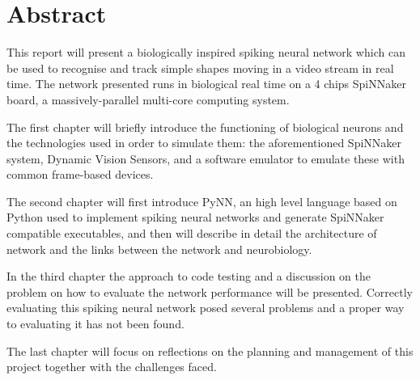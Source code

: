 \thispagestyle{plain}
\chapter*{Abstract}
This report will present a biologically inspired spiking neural network which can be used to recognise and track simple shapes moving in a video stream in real time. The network presented runs in biological real time on a 4 chips SpiNNaker board, a massively-parallel multi-core computing system. 

The first chapter will briefly introduce the functioning of biological neurons and the technologies used in order to simulate them: the aforementioned SpiNNaker system, Dynamic Vision Sensors, and a software emulator to emulate these with common frame-based devices.

The second chapter will first introduce PyNN, an high level language based on Python used to implement spiking neural networks and generate SpiNNaker compatible executables, and then will describe in detail the architecture of network and the links between the network and neurobiology.

In the third chapter the approach to code testing and a discussion on the problem on how to evaluate the network performance will be presented. Correctly evaluating this spiking neural network posed several problems and a proper way to evaluating it has not been found.

The last chapter will focus on reflections on the planning and management of this project together with the challenges faced. 
